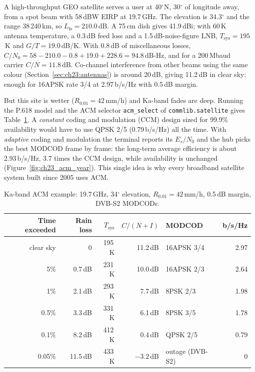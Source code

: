 \begin{worked}
A high-throughput GEO satellite serves a user at 40$^\circ$N, 30$^\circ$ of longitude away,
from a spot beam with 58\,dBW EIRP at 19.7\,GHz. The elevation is 34.3$^\circ$ and the range
38\,240\,km, so $L_{\text{fs}}=210.0$\,dB. A 75\,cm dish gives 41.9\,dBi; with 60\,K antenna
temperature, a 0.3\,dB feed loss and a 1.5\,dB-noise-figure LNB, $T_{\text{sys}}=195$\,K and
$G/T=19.0$\,dB/K. With 0.8\,dB of miscellaneous losses,
$C/N_0=58-210.0-0.8+19.0+228.6=94.8$\,dB-Hz, and for a 200\,Mbaud carrier $C/N=11.8$\,dB. Co-channel
interference from other beams using the same colour (Section~\ref{sec:ch23:antennas}) is around
20\,dB, giving 11.2\,dB in clear sky: enough for 16APSK rate 3/4 at 2.97\,b/s/Hz with 0.5\,dB margin.

But this site is wetter ($R_{0.01}=42$\,mm/h) and Ka-band fades are deep. Running the P.618 model
and the ACM selector \texttt{acm\_select} of \texttt{commlib.satellite} gives
Table~\ref{tab:ch23:kaacm}. A \emph{constant} coding and modulation (CCM) design sized for 99.9\%
availability would have to use QPSK 2/5 (0.79\,b/s/Hz) all the time. With \emph{adaptive} coding
and modulation the terminal reports its $E_s/N_0$ and the hub picks the best MODCOD frame by frame:
the long-term average efficiency is about 2.93\,b/s/Hz, 3.7 times the CCM design, while
availability is unchanged (Figure~\ref{fig:ch23_acm_year}). This single idea is why every broadband
satellite system built since 2005 uses ACM.
\end{worked}

\begin{table}[htbp]\centering\small
\caption{Ka-band ACM example: 19.7\,GHz, 34$^\circ$ elevation, $R_{0.01}=42$\,mm/h, 0.5\,dB
margin, DVB-S2 MODCODs.}\label{tab:ch23:kaacm}
\begin{tabular}{@{}r r r r l r@{}}
\toprule
Time exceeded & Rain loss & $T_{\text{sys}}$ & $C/(N+I)$ & MODCOD & b/s/Hz\\
\midrule
clear sky & 0 & 195\,K & 11.2\,dB & 16APSK 3/4 & 2.97\\
5\% & 0.7\,dB & 231\,K & 10.0\,dB & 16APSK 2/3 & 2.64\\
1\% & 2.1\,dB & 293\,K & 7.7\,dB & 8PSK 2/3 & 1.98\\
0.5\% & 3.3\,dB & 331\,K & 6.1\,dB & 8PSK 3/5 & 1.78\\
0.1\% & 8.2\,dB & 412\,K & 0.4\,dB & QPSK 2/5 & 0.79\\
0.05\% & 11.5\,dB & 433\,K & $-3.2$\,dB & outage (DVB-S2) & 0\\
\bottomrule
\end{tabular}
\end{table}

